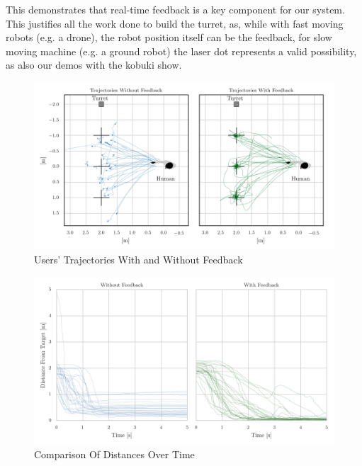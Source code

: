 This demonstrates that real-time feedback is a key component for our system. This justifies all the work done to build the turret, as, while with fast moving robots (e.g. a drone), the robot position itself can be the feedback, for slow moving machine (e.g. a ground robot) the laser dot represents a valid possibility, as also our demos with the kobuki show.

\begin{figure}
	\centering
	\includegraphics[width=\textwidth]{img/userTrajectories.png}%
	\caption{Users' Trajectories With and Without Feedback}
	\label{fig:userTrajectories}
\end{figure}
\begin{figure}
	\centering
	\includegraphics[width=\textwidth]{img/distanceComparison.png}%
	\caption{Comparison Of Distances Over Time}
	\label{fig:distanceComparison}
\end{figure}
